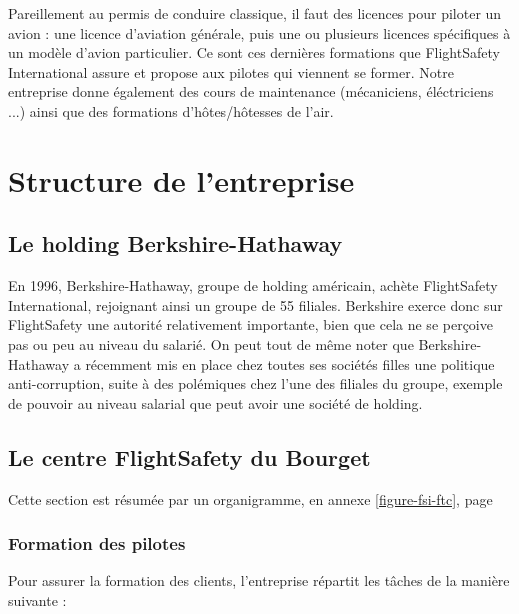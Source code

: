 \documentclass[a4paper,french,11pt,openany,oneside]{memoir}
\begin{document}
Pareillement au permis de conduire classique, il faut des licences pour piloter un avion : une licence d'aviation générale, puis une ou plusieurs licences spécifiques à un modèle d'avion particulier. Ce sont ces dernières formations que FlightSafety International assure et propose aux pilotes qui viennent se former. Notre entreprise donne également des cours de maintenance (mécaniciens, éléctriciens ...) ainsi que des formations d'hôtes/hôtesses de l'air.

\chapter{Structure de l'entreprise}

\section{Le holding Berkshire-Hathaway}

En 1996, Berkshire-Hathaway, groupe de holding américain, achète FlightSafety International, rejoignant ainsi un groupe de 55 filiales. Berkshire exerce donc sur FlightSafety une autorité relativement importante, bien que cela ne se perçoive pas ou peu au niveau du salarié. On peut tout de même noter que Berkshire-Hathaway a récemment mis en place chez toutes ses sociétés filles une politique anti-corruption, suite à des polémiques chez l'une des filiales du groupe, exemple de pouvoir au niveau salarial que peut avoir une société de holding.

\section{Le centre FlightSafety du Bourget}

Cette section est résumée par un organigramme, en annexe \ref{figure-fsi-ftc}, page \pageref{figure-fsi-ftc}

\subsection{Formation des pilotes}

Pour assurer la formation des clients, l'entreprise répartit les tâches de la manière suivante : \\
\end{document}
